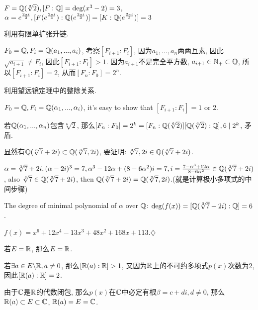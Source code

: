 \documentclass{report}
\begin{document}

\sol
{

    $F=\mathbb{Q}(\sqrt[3]{2}), [F:\mathbb{Q}]=\deg (x^3-2)=3$, $\alpha=e^{\frac{2\pi i}{3}}, [F(e^{\frac{2\pi i}{3}}): \mathbb{Q}(e^{\frac{2\pi i}{3}})]=[K:\mathbb{Q}(e^{\frac{2\pi i}{3}})]=3$
}


\sol
{

    利用有限单扩张升链.

    $F_0=\mathbb{Q}, F_i=\mathbb{Q}(a_1,...,a_i)$, 考察$[F_{i+1}:F_i]$, 因为$a_1,...,a_n$两两互素, 因此$\sqrt{a_{i+1}} \neq F_{i}$, 因此$[F_{i+1}:F_i]>1$. 因为$a_{i+1}$不是完全平方数, $a_{i+1} \in \mathbb{N}_+ \subset \mathbb{Q}$, 所以$[F_{i+1}:F_i]=2$, 从而$[F_n:F_0]=2^n$.
}


\sol
{

    利用望远镜定理中的整除关系.

    $F_0=\mathbb{Q}, F_i=\mathbb{Q}(\alpha_1,...,\alpha_i)$, it's easy to show that $[F_{i+1}:F_i]=1$ or $2$.

    若$\mathbb{Q}(\alpha_1,...,\alpha_n)$包含$\sqrt[6]{2}$, 那么$[F_n:F_0]=2^k=[F_n:\mathbb{Q}(\sqrt[6]{2})][\mathbb{Q}(\sqrt[6]{2}):\mathbb{Q}], 6\mid 2^k$, 矛盾. 
}


\sol
{

    显然有$\mathbb{Q}(\sqrt[3]{7}+2i)\subset \mathbb{Q}(\sqrt[3]{7},2i)$, 要证明: $\sqrt[3]{7},2i \in \mathbb{Q}(\sqrt[3]{7}+2i)$.

    $\alpha=\sqrt[3]{7}+2i, (\alpha-2i)^3=7, \alpha^3-12\alpha+(8-6\alpha^2)i=7, i=\frac{7-\alpha^3+12\alpha}{8-6\alpha^2} \in \mathbb{Q}(\sqrt[3]{7}+2i)$, also $\sqrt[3]{7} \in \mathbb{Q}(\sqrt[3]{7}+2i)$, then $\mathbb{Q}(\sqrt[3]{7}+2i)=\mathbb{Q}(\sqrt[3]{7},2i)$.(就是计算极小多项式的中间步骤)

    The degree of minimal polynomial of $\alpha$ over $\mathbb{Q}$: $\deg(f(x))=[\mathbb{Q}(\sqrt[3]{7}+2i):\mathbb{Q}]=6$.

    $f(x)=x^6+12x^4-13x^3+48x^2+168x+113$.$\diamondsuit$
}


\sol
{
    
    若$E=\mathbb{R}$, 那么$E=\mathbb{R}$.

    若$\exists a\in E \backslash \mathbb{R}, a\neq 0$, 那么$[\mathbb{R}(a):\mathbb{R}]>1$, 又因为$\mathbb{R}$上的不可约多项式$p(x)$次数为$2$, 因此$[\mathbb{R}(a):\mathbb{R}]=2$.

    由于$\mathbb{C}$是$\mathbb{R}$的代数闭包, 那么$p(x)$在$\mathbb{C}$中必定有根$\beta=c+di, d\neq 0$, 那么$\mathbb{R}(a)\subset E \subset \mathbb{C}$, $\mathbb{R}(a)=E=\mathbb{C}$.
}
\end{document}
